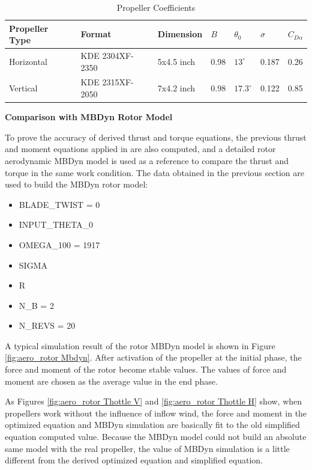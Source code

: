 \begin{table}[h]
\centering
\caption{Propeller Coefficients}
\label{tab:propeller_specs}
\begin{tabular}{@{}lllllll@{}}
\hline
Propeller Type & Format & Dimension & $B$ & $\theta_0$ & $\sigma$ & $C_{D\alpha}$ \\
\hline
Horizontal & KDE 2304XF-2350 & 5x4.5 inch & 0.98 & $13^\circ$ & 0.187 & 0.26 \\
Vertical & KDE 2315XF-2050 & 7x4.2 inch & 0.98 & $17.3^\circ$ & 0.122 & 0.85 \\
\hline
\end{tabular}
\end{table}

\textbf{Comparison with MBDyn Rotor Model}

To prove the accuracy of derived thrust and torque equations, the previous thrust and moment equations applied in \cite{battaini2022} are also computed, and a detailed rotor aerodynamic MBDyn model is used as a reference to compare the thrust and torque in the same work condition. The data obtained in the previous section are used to build the MBDyn rotor model:

\begin{itemize}
    \item BLADE\_TWIST = 0
    \item INPUT\_THETA\_0
    \item OMEGA\_100 = 1917
    \item SIGMA
    \item R
    \item N\_B = 2
    \item N\_REVS = 20
\end{itemize}

A typical simulation result of the rotor MBDyn model is shown in Figure \ref{fig:aero_rotor Mbdyn}. After activation of the propeller at the initial phase, the force and moment of the rotor become stable values. The values of force and moment are chosen as the average value in the end phase.

As Figures \ref{fig:aero_rotor Thottle V} and \ref{fig:aero_rotor Thottle H} show, when propellers work without the influence of inflow wind, the force and moment in the optimized equation and MBDyn simulation are basically fit to the old simplified equation computed value. Because the MBDyn model could not build an absolute same model with the real propeller, the value of MBDyn simulation is a little different from the derived optimized equation and simplified equation.

